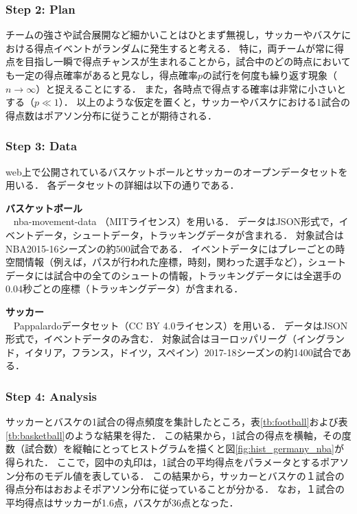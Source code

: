 \subsubsection*{Step 2: Plan}
%
チームの強さや試合展開など細かいことはひとまず無視し，サッカーやバスケにおける得点イベントがランダムに発生すると考える．
%
特に，両チームが常に得点を目指し一瞬で得点チャンスが生まれることから，試合中のどの時点においても一定の得点確率があると見なし，得点確率$ p $の試行を何度も繰り返す現象（$ n\to \infty $）と捉えることにする．
%
また，各時点で得点する確率は非常に小さいとする（$ p \ll 1 $）．
%
以上のような仮定を置くと，サッカーやバスケにおける1試合の得点数はポアソン分布に従うことが期待される．
%


\subsubsection*{Step 3: Data}
%
web上で公開されているバスケットボールとサッカーのオープンデータセットを用いる．
%
各データセットの詳細は以下の通りである．

%
\begin{description}

\item{\textbf{バスケットボール}}\\~
%
nba-movement-data \cite{NBA}（MITライセンス）を用いる．
%
データはJSON形式で，イベントデータ，シュートデータ，トラッキングデータが含まれる．
%
対象試合はNBA2015-16シーズンの約500試合である．
%
イベントデータにはプレーごとの時空間情報（例えば，パスが行われた座標，時刻，関わった選手など），シュートデータには試合中の全てのシュートの情報，トラッキングデータには全選手の0.04秒ごとの座標（トラッキングデータ）が含まれる．
%

\vspace{0.5cm}
\item{\textbf{サッカー}}\\~
%
Pappalardoデータセット\cite{Pappalardo}（CC BY 4.0ライセンス）を用いる．
%
%
データはJSON形式で，イベントデータのみ含む．
%
対象試合はヨーロッパリーグ（イングランド，イタリア，フランス，ドイツ，スペイン）2017-18シーズンの約1400試合である．
%
\end{description}
%

\subsubsection*{Step 4: Analysis}
%
サッカーとバスケの1試合の得点頻度を集計したところ，表\ref{tb:football}および表\ref{tb:basketball}のような結果を得た．
%
この結果から，1試合の得点を横軸，その度数（試合数）を縦軸にとってヒストグラムを描くと図\ref{fig:hist_germany_nba}が得られた．
%
ここで，図中の丸印は，1試合の平均得点をパラメータとするポアソン分布のモデル値を表している．
%
この結果から，サッカーとバスケの１試合の得点分布はおおよそポアソン分布に従っていることが分かる．
%
なお，１試合の平均得点はサッカーが1.6点，バスケが36点となった．
%

